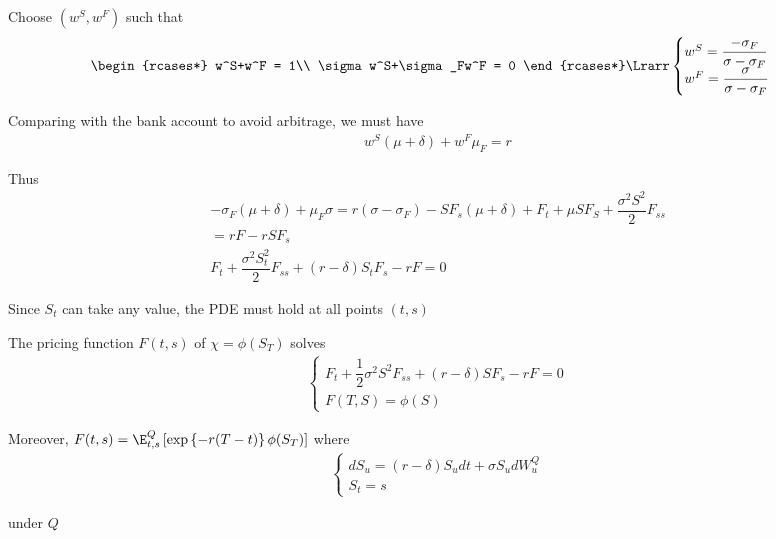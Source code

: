 \noindent Choose $(w^S,w^F)$ such that
\begin{equation*}
  \begin{gathered}
    \begin{rcases*}
      w^S+w^F = 1\\
      \sigma w^S+\sigma_Fw^F = 0
    \end{rcases*}\Lrarr
    \begin{cases}
      w^S = \dfrac{-\sigma_F}{\sigma-\sigma_F}\\
      w^F =\dfrac{\sigma}{\sigma-\sigma_F}
    \end{cases}
  \end{gathered}
\end{equation*}
\par\bigskip
\noindent Comparing with the bank account to avoid arbitrage, we must have
\begin{equation*}
  \begin{gathered}
    w^S(\mu+\delta)+w^F\mu_F =r
  \end{gathered}
\end{equation*}\par
\noindent Thus
\begin{equation*}
  \begin{gathered}
    -\sigma_F(\mu+\delta)+\mu_F\sigma = r(\sigma-\sigma_F)-SF_s(\mu+\delta)+F_t+\mu SF_S+\dfrac{\sigma^2S^2}{2}F_{ss}\\
    = rF-rSF_s\\
    F_t +\dfrac{\sigma^2S_t^2}{2}F_{ss}+\left(r-\delta\right)S_tF_s-rF=0
  \end{gathered}
\end{equation*}\par
\noindent Since $S_t$ can take any value, the PDE must hold at all points $(t,s)$
\par\bigskip
\begin{lem}[]{}
  The pricing function $F(t,s)$ of $\chi = \phi(S_T)$ solves
  \begin{equation*}
    \begin{gathered}
      \begin{cases}
        F_t + \dfrac{1}{2}\sigma^2S^2F_{ss}+(r-\delta)SF_s -rF=0\\
        F(T,S) = \phi(S)
      \end{cases}
    \end{gathered}
  \end{equation*}
  \par\bigskip
  \noindent Moreover, $F(t,s) =\E_{t,s}^Q\left[\text{exp}\left\{-r(T-t)\right\}\phi(S_T)\right]$ where
  \begin{equation*}
    \begin{gathered}
      \begin{cases}
        dS_u = (r-\delta)S_udt+\sigma S_udW_u^Q\\
        S_t = s
      \end{cases}
    \end{gathered}
  \end{equation*}\par
  \noindent under $Q$
\end{lem}
